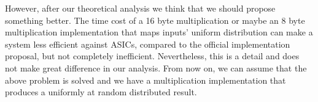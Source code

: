 However, after our theoretical analysis we think that we should propose something better. The time cost of a 16 byte multiplication or maybe an 8 byte multiplication implementation that maps inputs' uniform distribution can make a system less efficient against ASICs, compared to the official implementation proposal, but not completely inefficient. Nevertheless, this is a detail and does not make great difference in our analysis. From now on, we can assume that the above problem is solved and we have a multiplication implementation that produces a uniformly at random distributed result.
